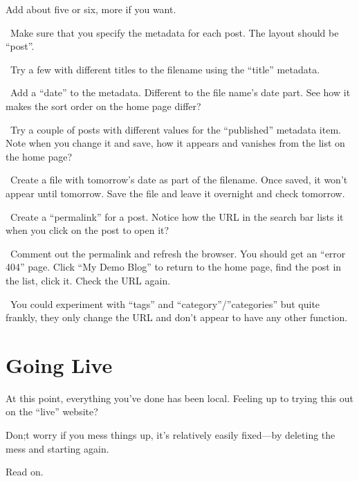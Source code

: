 Add about five or six, more if you want.

\lyxarrow{}~Make sure that you specify the metadata for each post. The layout should be ``post''.

\lyxarrow{}~Try a few with different titles to the filename using the ``title'' metadata.

\lyxarrow{}~Add a ``date'' to the metadata. Different to the file name's date part. See how it makes the sort order on the home page differ?

\lyxarrow{}~Try a couple of posts with different values for the ``published'' metadata item. Note when you change it and save, how it appears and vanishes from the list on the home page?

\lyxarrow{}~Create a file with tomorrow's date as part of the filename. Once saved, it won't appear until tomorrow. Save the file and leave it overnight and check tomorrow.

\lyxarrow{}~Create a ``permalink'' for a post. Notice how the URL in the search bar lists it when you click on the post to open it?

\lyxarrow{}~Comment out the permalink and refresh the browser. You should get an ``error 404'' page. Click ``My Demo Blog'' to return to the home page, find the post in the list, click it. Check the URL again.

\lyxarrow{}~You could experiment with ``tags'' and ``category''/''categories'' but quite frankly, they only change the URL and don't appear to have any other function.

\section{Going Live}

At this point, everything you've done has been local. Feeling up to trying this out on the ``live'' website?

Don;t worry if you mess things up, it's relatively easily fixed---by deleting the mess and starting again.

Read on.